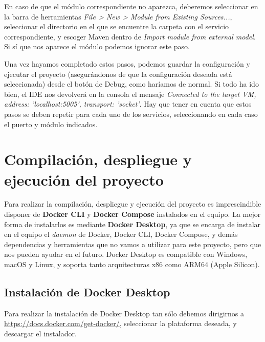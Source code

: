 
En caso de que el módulo correspondiente no aparezca, deberemos seleccionar en la barra de herramientas \textit{File > New > Module from Existing Sources...}, seleccionar el directorio en el que se encuentre la carpeta con el servicio correspondiente, y escoger Maven dentro de \textit{Import module from external model}. Si sí que nos aparece el módulo podemos ignorar este paso.


Una vez hayamos completado estos pasos, podemos guardar la configuración y ejecutar el proyecto (asegurándonos de que la configuración deseada está seleccionada) desde el botón de Debug, como haríamos de normal. Si todo ha ido bien, el IDE nos devolverá en la consola el mensaje \textit{Connected to the target VM, address: 'localhost:5005', transport: 'socket'}. Hay que tener en cuenta que estos pasos se deben repetir para cada uno de los servicios, seleccionando en cada caso el puerto y módulo indicados.

\section{Compilación, despliegue y ejecución del proyecto}

Para realizar la compilación, despliegue y ejecución del proyecto es imprescindible disponer de \textbf{Docker CLI} y \textbf{Docker Compose} instalados en el equipo. La mejor forma de instalarlos es mediante \textbf{Docker Desktop}, ya que se encarga de instalar en el equipo el \textit{daemon} de Docker, Docker CLI, Docker Compose, y demás dependencias y herramientas que no vamos a utilizar para este proyecto, pero que nos pueden ayudar en el futuro. Docker Desktop es compatible con Windows, macOS y Linux, y soporta tanto arquitecturas x86 como ARM64 (Apple Silicon).

\subsection{Instalación de Docker Desktop}


Para realizar la instalación de Docker Desktop tan sólo debemos dirigirnos a \url{https://docs.docker.com/get-docker/}, seleccionar la plataforma deseada, y descargar el instalador.

